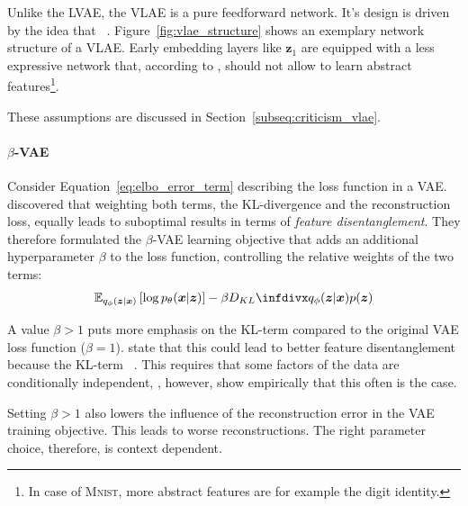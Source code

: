 Unlike the \ac{LVAE}, the \ac{VLAE} is a pure feedforward network.
It's design is driven by the idea that ~\citep{zhao2017learning}.
Figure~\ref{fig:vlae_structure} shows an exemplary network structure of a \ac{VLAE}.
Early embedding layers like $\bm{z}_1$ are equipped with a less expressive network that, according to \citet{zhao2017learning}, should not allow to learn abstract features\footnote{In case of \textsc{Mnist}, more abstract features are for example the digit identity.}.

These assumptions are discussed in Section~\ref{subseq:criticism_vlae}.

\paragraph{$\beta$-VAE}

Consider Equation~\ref{eq:elbo_error_term} describing the loss function in a \ac{VAE}.
\citet{higgins2017beta} discovered that weighting both terms, the KL-divergence and the reconstruction loss, equally leads to suboptimal results in terms of \textit{feature disentanglement}.
They therefore formulated the $\beta$-VAE learning objective that adds an additional hyperparameter $\beta$ to the loss function, controlling the relative weights of the two terms:
\begin{align}
    \mathbb{E}_{q_{\phi}(\bm{z} | \bm{x})}\left[\log p_{\theta}(\bm{x} | \bm{z})\right]-\beta \kldiv{q_{\phi}(\bm{z} | \bm{x})}{p(\bm{z})}
\end{align}

A value $\beta > 1$ puts more emphasis on the KL-term compared to the original \ac{VAE} loss function ($\beta = 1$).
\citet{higgins2017beta} state that this could lead to better feature disentanglement because the KL-term ~\citep{higgins2017beta}.
This requires that some factors of the data are conditionally independent, \citet{higgins2017beta}, however, show empirically that this often is the case.

Setting $\beta > 1$ also lowers the influence of the reconstruction error in the \ac{VAE} training objective.
This leads to worse reconstructions.
The right parameter choice, therefore, is context dependent.

